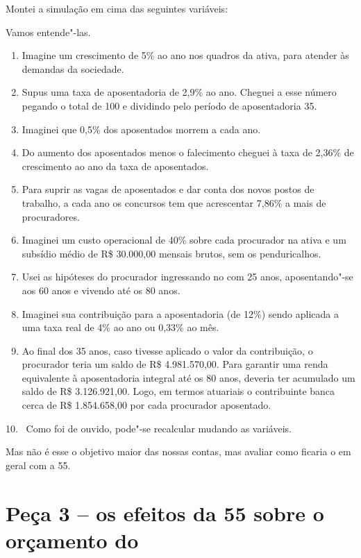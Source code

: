 Montei a simulação em cima das seguintes variáveis:


Vamos entende"-las.

\begin{enumerate}
\itemsep1pt\parskip0pt
\item
  Imagine um crescimento de 5\% ao ano nos quadros da ativa, para
  atender às demandas da sociedade.
\item
  Supus uma taxa de aposentadoria de 2,9\% ao ano. Cheguei a esse número
  pegando o total de 100 e dividindo pelo período de aposentadoria 35.
\item
  Imaginei que 0,5\% dos aposentados morrem a cada ano.
\item
  Do aumento dos aposentados menos o falecimento cheguei à taxa de
  2,36\% de crescimento ao ano da taxa de aposentados.
\item
  Para suprir as vagas de aposentados e dar conta dos novos postos de
  trabalho, a cada ano os concursos tem que acrescentar 7,86\% a mais de
  procuradores.
\item
  Imaginei um custo operacional de 40\% sobre cada procurador na ativa e
  um subsídio médio de R\$ 30.000,00 mensais brutos, sem os
  penduricalhos.
\item
  Usei as hipóteses do procurador ingressando no  com 25 anos,
  aposentando"-se aos 60 anos e vivendo até os 80 anos.
\item
  Imaginei sua contribuição para a aposentadoria (de 12\%) sendo
  aplicada a uma taxa real de 4\% ao ano ou 0,33\% ao mês.
\item
  Ao final dos 35 anos, caso tivesse aplicado o valor da contribuição, o
  procurador teria um saldo de R\$ 4.981.570,00. Para garantir uma renda
  equivalente à aposentadoria integral até os 80 anos, deveria ter
  acumulado um saldo de R\$ 3.126.921,00. Logo, em termos atuariais o
  contribuinte banca cerca de R\$ 1.854.658,00 por cada procurador
  aposentado.
\end{enumerate}

10.~ Como foi de ouvido, pode"-se recalcular mudando as variáveis.

Mas não é esse o objetivo maior das nossas contas, mas avaliar como
ficaria o  em geral com a  55.

\section{Peça 3 -- os efeitos da  55 sobre o orçamento do }

